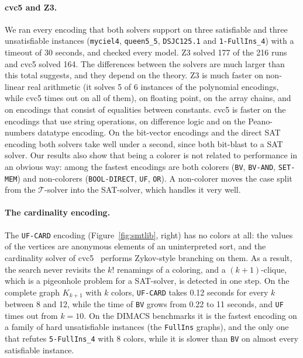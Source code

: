 \documentclass[12pt,a4paper]{article}
\newcommand{\T}{\mathcal{T}}
\newcommand{\enc}[1]{\texttt{#1}}
\theoremstyle{definition}
\begin{document}
\paragraph{cvc5 and Z3.}
We ran every encoding that both solvers support on three satisfiable and three
unsatisfiable instances (\texttt{myciel4}, \texttt{queen5\_5}, \texttt{DSJC125.1}
and \texttt{1-FullIns\_4}) with a timeout of 30 seconds, and checked every model.
Z3 solved 177 of the 216 runs and cvc5 solved 164. The differences between the
solvers are much larger than this total suggests, and they depend on the theory.
Z3 is much faster on non-linear real arithmetic (it solves 5 of 6 instances of the
polynomial encodings, while cvc5 times out on all of them), on floating point, on
the array chains, and on encodings that consist of equalities between constants.
cvc5 is faster on the encodings that use string operations, on difference logic and
on the Peano-numbers datatype encoding. On the bit-vector encodings and the direct
SAT encoding both solvers take well under a second, since both bit-blast to a SAT
solver. Our results also show that being a colorer is not related to performance in
an obvious way: among the fastest encodings are both colorers (\enc{BV},
\enc{BV-AND}, \enc{SET-MEM}) and non-colorers (\enc{BOOL-DIRECT}, \enc{UF},
\enc{OR}). A non-colorer moves the case split from the $\T$-solver into the
SAT-solver, which handles it very well.

\paragraph{The cardinality encoding.}
The \enc{UF-CARD} encoding (Figure~\ref{fig:smtlib}, right) has no colors at all:
the values of the vertices are anonymous elements of an uninterpreted sort, and the
cardinality solver of cvc5~\cite{ReynoldsTGK13} performs Zykov-style branching on
them. As a result, the search never revisits the $k!$ renamings of a coloring, and
a $(k+1)$-clique, which is a pigeonhole problem for a SAT-solver, is detected in one
step. On the complete graph $K_{k+1}$ with $k$ colors, \enc{UF-CARD} takes 0.12
seconds for every $k$ between 8 and 12, while the time of \enc{BV} grows from 0.22
to 11 seconds, and \enc{UF} times out from $k = 10$. On the DIMACS benchmarks it is
the fastest encoding on a family of hard unsatisfiable instances (the
\texttt{FullIns} graphs), and the only one that refutes \texttt{5-FullIns\_4} with
8 colors, while it is slower than \enc{BV} on almost every satisfiable instance.
\end{document}

